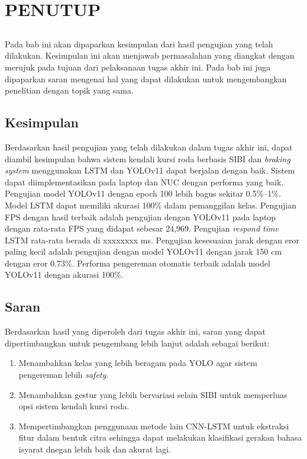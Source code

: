 \chapter{PENUTUP}
\label{sec:chap5_tutup}
\vspace{1ex}
\section*{}
Pada bab ini akan dipaparkan kesimpulan dari hasil pengujian yang telah dilakukan. Kesimpulan ini akan menjawab permasalahan yang diangkat dengan merujuk pada tujuan dari pelaksanaan tugas akhir ini. Pada bab ini juga dipaparkan saran mengenai hal yang dapat dilakukan untuk mengembangkan penelitian dengan topik yang sama. \vspace{1ex}

\section{Kesimpulan}
\label{sec:sec4_kesimpulan}
\vspace{1ex}
Berdasarkan hasil pengujian yang telah dilakukan dalam tugas akhir ini, dapat diambil kesimpulan bahwa sistem kendali kursi roda berbasis SIBI dan \emph{braking system} menggunakan LSTM dan YOLOv11 dapat berjalan dengan baik. Sistem dapat diimplementasikan pada laptop dan NUC dengan performa yang baik. Pengujian model YOLOv11 dengan epoch 100 lebih bagus sekitar 0.5\%–1\%. Model LSTM dapat memiliki akurasi 100\% dalam pemanggilan kelas. Pengujian FPS dengan hasil terbaik adalah pengujian dengan YOLOv11 pada laptop dengan rata-rata FPS yang didapat sebesar 24,969. Pengujian \emph{respond time} LSTM rata-rata berada di xxxxxxxx ms. Pengujian kesesuaian jarak dengan eror paling kecil adalah pengujian dengan model YOLOv11 dengan jarak 150 cm dengan eror 0.73\%. Performa pengereman otomatis terbaik adalah model YOLOv11 dengan akurasi 100\%.
\section{Saran}
\label{sec:sec4_saran}
\vspace{1ex}
Berdasarkan hasil yang diperoleh dari tugas akhir ini, saran yang dapat dipertimbangkan untuk pengembang lebih lanjut adalah sebagai berikut:
\begin{enumerate}
    \item Menambahkan kelas yang lebih beragam pada YOLO agar sistem pengereman lebih \emph{safety}.
    \item Menambahkan gestur yang lebih bervariasi selain SIBI untuk memperluas opsi sistem kendali kursi roda.
    \item Mempertimbangkan penggunaan metode lain CNN-LSTM untuk ekstraksi fitur dalam bentuk citra sehingga dapat melakukan klasifikasi gerakan bahasa isyarat dnegan lebih baik dan akurat lagi.
\end{enumerate}

